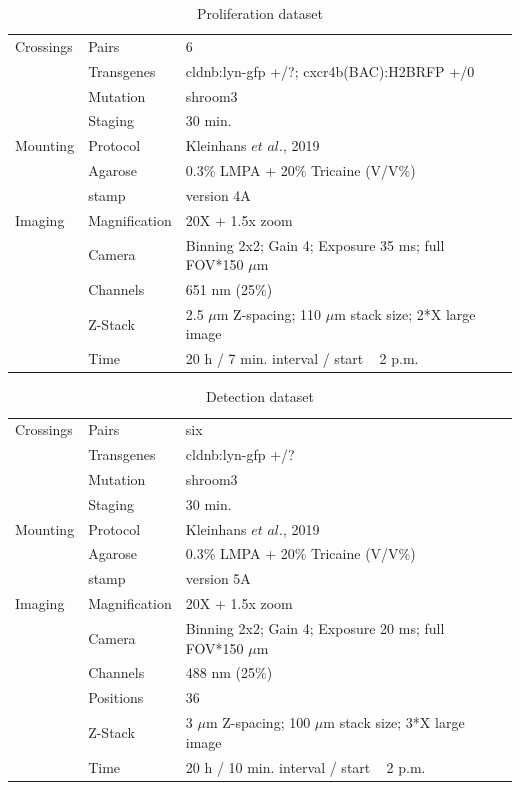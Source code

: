 \documentclass[10pt, b5paper, singlespacinge, twoside]{reedthesis} %
\theoremstyle{definition}
\theoremstyle{definition}
\theoremstyle{definition}
\theoremstyle{remark}
\begin{document}
\begin{table}[!h]

\caption{\label{tab:imgdatprol}Proliferation dataset}
\centering
\begin{tabu} to 
\toprule
Crossings & Pairs & 6\\
 & Transgenes & cldnb:lyn-gfp +/?; cxcr4b(BAC):H2BRFP +/0\\
 & Mutation & shroom3\\
 & Staging & 30 min.\\
Mounting & Protocol & Kleinhans $\textit{et al.}$, 2019\\
\addlinespace
 & Agarose & 0.3$\%$ LMPA + 20$\%$ Tricaine (V/V$\%$)\\
 & stamp & version 4A\\
Imaging & Magnification & 20X + 1.5x zoom\\
 & Camera & Binning 2x2; Gain 4; Exposure 35 ms; full FOV*150 $\mu$m\\
 & Channels & 651 nm (25$\%$)\\
\addlinespace
 & Z-Stack & 2.5 $\mu$m Z-spacing; 110 $\mu$m stack size; 2*X large image\\
 & Time & 20 h / 7 min. interval / start ~ 2 p.m.\\
\bottomrule
\end{tabu}
\end{table}
\begin{table}[!h]

\caption{\label{tab:imgdatdet}Detection dataset}
\centering
\begin{tabu} to 
\toprule
Crossings & Pairs & six\\
 & Transgenes & cldnb:lyn-gfp +/?\\
 & Mutation & shroom3\\
 & Staging & 30 min.\\
Mounting & Protocol & Kleinhans $\textit{et al.}$, 2019\\
\addlinespace
 & Agarose & 0.3$\%$ LMPA + 20$\%$ Tricaine (V/V$\%$)\\
 & stamp & version 5A\\
Imaging & Magnification & 20X + 1.5x zoom\\
 & Camera & Binning 2x2; Gain 4; Exposure 20 ms; full FOV*150 $\mu$m\\
 & Channels & 488 nm (25$\%$)\\
\addlinespace
 & Positions & 36\\
 & Z-Stack & 3 $\mu$m Z-spacing; 100 $\mu$m stack size; 3*X large image\\
 & Time & 20 h / 10 min. interval / start ~ 2 p.m.\\
\bottomrule
\end{tabu}
\end{table}
\end{document}
